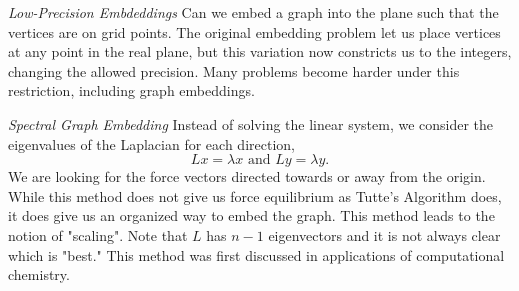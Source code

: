 \documentclass{article}
\begin{document}
    \medskip \noindent \textit{Low-Precision Embdeddings}
  \newline \noindent Can we embed a graph into the plane such that the vertices are on grid points. The original embedding problem let us place vertices at any point in the real plane, but this variation now constricts us to the integers, changing the allowed precision. Many problems become harder under this restriction, including graph embeddings. 
  
    \medskip \noindent \textit{Spectral Graph Embedding}
  \newline \noindent Instead of solving the linear system, we consider the eigenvalues of the Laplacian for each direction, $$Lx=\lambda x \text{ and } Ly=\lambda y.$$
  We are looking for the force vectors directed towards or away from the origin. While this method does not give us force equilibrium as Tutte's Algorithm does, it does give us an organized way to embed the graph. This method leads to the notion of "scaling". Note that $L$ has $n-1$ eigenvectors and it is not always clear which is "best." This method was first discussed in applications of computational chemistry.
\end{document}
